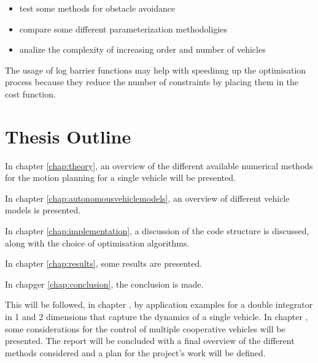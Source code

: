 \begin{itemize}
    \item test some methods for obstacle avoidance
    \item compare some different parameterization methodoligies
    \item analize the complexity of increasing order and number of vehicles
\end{itemize}


\par The usage of log barrier functions may help with speedinng up the optimisation process because they reduce the number of constraints by placing them in the cost function.





\section{Thesis Outline}


\par In chapter \ref{chap:theory}, an overview of the different available numerical methods for the motion planning for a single vehicle will be presented. 
\par In chapter \ref{chap:autonomousvehiclemodels}, an overview of different vehicle models is presented. 
\par In chapter \ref{chap:implementation}, a discussion of the code structure is discussed, along with the choice of optimisation algorithms. 
\par In chapter \ref{chap:results}, some results are presented. 
\par In chapger \ref{chap:conclusion}, the conclusion is made. 

This will be followed, in chapter , by application examples for a double integrator in 1 and 2 dimensions that capture the dynamics of a single vehicle. In chapter , some considerations for the control of multiple cooperative vehicles will be presented. The report will be concluded with a final overview of the different methods considered and a plan for the project's work will be defined.

